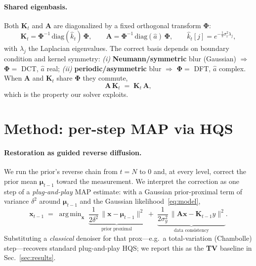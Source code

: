 \documentclass[11pt]{article}
\newcommand{\bm}[1]{\boldsymbol{#1}}  %
\newcommand{\Phimat}{\bm{\Phi}}
\newcommand{\A}{\mathbf{A}}
\newcommand{\K}{\mathbf{K}}
\newcommand{\x}{\mathbf{x}}
\newcommand{\bmu}{\bm{\mu}}
\DeclareMathOperator*{\argmin}{arg\,min}
\begin{document}
\paragraph{Shared eigenbasis.}
Both $\K_t$ and $\A$ are diagonalized by a fixed orthogonal transform $\Phimat$:
\begin{equation}
\K_t=\Phimat^{-1}\,\mathrm{diag}(\hat{k}_t)\,\Phimat,\qquad
\A=\Phimat^{-1}\,\mathrm{diag}(\hat{a})\,\Phimat,\qquad
\hat{k}_t[j]=e^{-\tfrac12\sigma_t^2\lambda_j},
\label{eq:diag}
\end{equation}
with $\lambda_j$ the Laplacian eigenvalues. The correct basis depends on boundary
condition and kernel symmetry:
\emph{(i)} \textbf{Neumann/symmetric} blur (Gaussian) $\Rightarrow$ $\Phimat=$ DCT,
$\hat a$ real; \emph{(ii)} \textbf{periodic/asymmetric} blur $\Rightarrow$
$\Phimat=$ DFT, $\hat a$ complex. When $\A$ and $\K_t$ share $\Phimat$
they commute,
\begin{equation}
\A\,\K_t \;=\; \K_t\,\A,
\label{eq:commute}
\end{equation}
which is the property our solver exploits.

\section{Method: per-step MAP via HQS}
\label{sec:method}

\paragraph{Restoration as guided reverse diffusion.}
We run the prior's reverse chain from $t=N$ to $0$ and, at every level, correct the prior
mean $\bmu_{t-1}$ toward the measurement. We interpret the correction as one step of a
\emph{plug-and-play} MAP estimate: with a Gaussian prior-proximal term of variance
$\delta^2$ around $\bmu_{t-1}$ and the Gaussian likelihood~\eqref{eq:model},
\begin{equation}
\x_{t-1} \;=\; \argmin_{\x}\;
\underbrace{\frac{1}{2\delta^2}\,\|\x-\bmu_{t-1}\|^2}_{\text{prior proximal}}
\;+\;
\underbrace{\frac{1}{2\sigma_y^2}\,\|\A\x-\K_{t-1}y\|^2}_{\text{data consistency}} .
\label{eq:map}
\end{equation}
Substituting a \emph{classical} denoiser for that prox---e.g.\ a total-variation (Chambolle) step---recovers standard
plug-and-play HQS; we report this as the \textbf{TV} baseline in Sec.~\ref{sec:results}.
\end{document}
